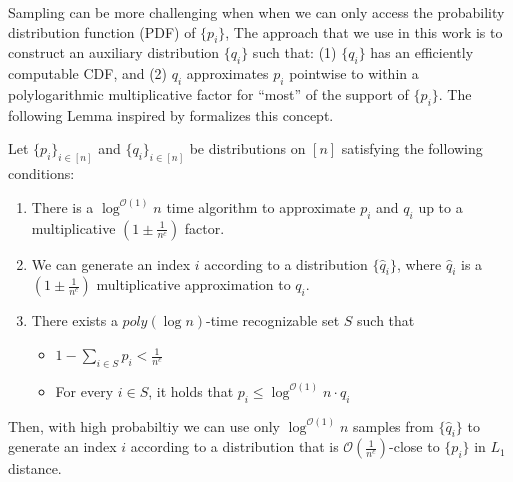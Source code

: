 Sampling can be more challenging when when we can only access the probability distribution function (PDF) of $\{p_i\}$,
The approach that we use in this work is to construct an auxiliary distribution $\{q_i\}$ such that:
(1) $\{ q_i\}$ has an efficiently computable CDF, and
(2) $q_i$ approximates $p_i$ pointwise to within a polylogarithmic multiplicative factor for ``most'' of the support of $\{ p_i\}$.
The following Lemma inspired by \cite{huge} formalizes this concept.
\begin{lemma}
\label{lem:rejection_sampling}
Let $\{p_i\}_{i\in [n]}$ and $\{q_i\}_{i\in [n]}$ be distributions on $[n]$ satisfying the following conditions:
\begin{enumerate}
    \item There is a $\log^{\mathcal O(1)}n$ time algorithm to approximate $p_i$ and $q_i$
    up to a multiplicative $\left(1\pm \frac{1}{n^c}\right)$ factor.
    \item We can generate an index $i$ according to a distribution $\{\hat q_i\}$,
    where $\hat q_i$ is a $\left(1\pm \frac{1}{n^c}\right)$ multiplicative approximation to $q_i$.
    \item There exists a $poly(\log n)$-time recognizable set $S$ such that
    \begin{itemize}
        \item $1-\sum\limits_{i\in S} p_i < \frac 1{n^c}$
        \item For every $i\in S$, it holds that $p_i\le \log^{\mathcal{O}(1)} n\cdot q_i$
    \end{itemize}
\end{enumerate}
Then, with high probabiltiy we can use only $\log^{\mathcal O(1)}n$ samples from $\{\hat q_i\}$ to generate an index $i$
according to a distribution that is $ \mathcal O\left(\frac{1}{n^c}\right)$-close to $\{p_i\}$ in $L_1$ distance.
\end{lemma}
